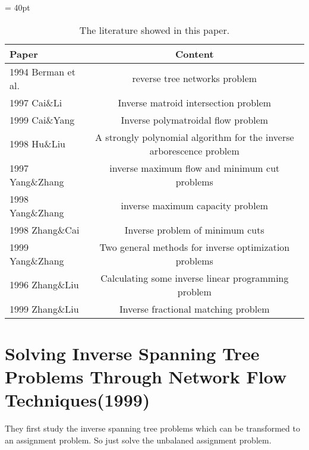 \documentclass[UTF8]{article}
\begin{document}
\begin{table}[ht]
 
 \tabcolsep = 40pt
 
 \small\renewcommand{}
 
 \caption{The literature showed in this paper.\label{tab:1}}
 
 {\begin{tabular}{lc}
   \hline
   Paper              & Content                                                              \\
   \hline
   1994 Berman et al. & reverse tree networks problem                                        \\
   \hline
   1997 Cai\&Li       & Inverse matroid intersection problem                                 \\
   \hline
   1999 Cai\&Yang     & Inverse polymatroidal flow problem                                   \\
   \hline
   1998 Hu\&Liu       & A strongly polynomial algorithm for the inverse arborescence problem \\
   \hline
   1997 Yang\&Zhang   & inverse maximum flow and minimum cut problems                        \\
   \hline
   1998 Yang\&Zhang   & inverse maximum capacity problem                                     \\
   \hline
   1998 Zhang\&Cai    & Inverse problem of minimum cuts                                      \\
   \hline
   1999 Yang\&Zhang   & Two general methods for inverse optimization problems                \\
   \hline
   1996 Zhang\&Liu    & Calculating some inverse linear programming problem                  \\
   \hline
   1999 Zhang\&Liu    & Inverse fractional matching problem                                  \\
   \hline
  \end{tabular}}
 {}
\end{table}


\section{Solving Inverse Spanning Tree Problems Through Network Flow Techniques(1999)}

They ﬁrst study the inverse spanning tree problems which can be transformed to an assignment problem. So just solve the unbalaned assignment problem.
\end{document}

